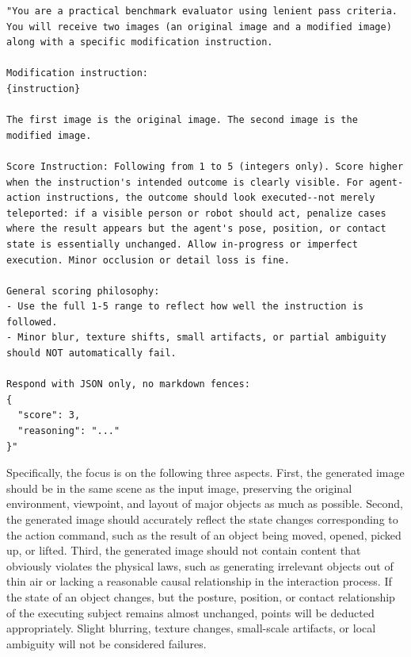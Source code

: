 \begin{center}
\begin{minipage}{0.90\linewidth}
\begin{lstlisting}[style=promptstyle, caption={Prompt used for benchmark evaluation.}, label={lst:evaluator_prompt}]
"You are a practical benchmark evaluator using lenient pass criteria. You will receive two images (an original image and a modified image) along with a specific modification instruction.

Modification instruction:
{instruction}

The first image is the original image. The second image is the modified image.

Score Instruction: Following from 1 to 5 (integers only). Score higher when the instruction's intended outcome is clearly visible. For agent-action instructions, the outcome should look executed--not merely teleported: if a visible person or robot should act, penalize cases where the result appears but the agent's pose, position, or contact state is essentially unchanged. Allow in-progress or imperfect execution. Minor occlusion or detail loss is fine.

General scoring philosophy:
- Use the full 1-5 range to reflect how well the instruction is followed.
- Minor blur, texture shifts, small artifacts, or partial ambiguity should NOT automatically fail.

Respond with JSON only, no markdown fences:
{
  "score": 3,
  "reasoning": "..."
}"
\end{lstlisting}
\end{minipage}
\end{center}

Specifically, the focus is on the following three aspects. First, the generated image should be in the same scene as the input image, preserving the original environment, viewpoint, and layout of major objects as much as possible. Second, the generated image should accurately reflect the state changes corresponding to the action command, such as the result of an object being moved, opened, picked up, or lifted. Third, the generated image should not contain content that obviously violates the physical laws, such as generating irrelevant objects out of thin air or lacking a reasonable causal relationship in the interaction process. If the state of an object changes, but the posture, position, or contact relationship of the executing subject remains almost unchanged, points will be deducted appropriately. Slight blurring, texture changes, small-scale artifacts, or local ambiguity will not be considered failures.

